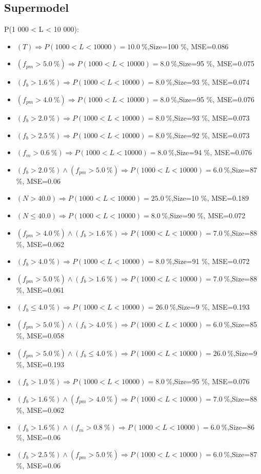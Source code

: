 \documentclass[numbered]{CSL}
\begin{document}
\subsection{Supermodel}
P(1 000 < L < 10 000):
\begin{itemize}
\item $(T) \Rightarrow P(1 000 < L < 10 000) = 10.0~\%$,\hfill Size=100 \%, MSE=0.086
\item $(f_{pm} > 5.0~\%) \Rightarrow P(1 000 < L < 10 000) = 8.0~\%$,\hfill Size=95 \%, MSE=0.075
\item $(f_b > 1.6~\%) \Rightarrow P(1 000 < L < 10 000) = 8.0~\%$,\hfill Size=93 \%, MSE=0.074
\item $(f_{pm} > 4.0~\%) \Rightarrow P(1 000 < L < 10 000) = 8.0~\%$,\hfill Size=95 \%, MSE=0.076
\item $(f_b > 2.0~\%) \Rightarrow P(1 000 < L < 10 000) = 8.0~\%$,\hfill Size=93 \%, MSE=0.073
\item $(f_b > 2.5~\%) \Rightarrow P(1 000 < L < 10 000) = 8.0~\%$,\hfill Size=92 \%, MSE=0.073
\item $(f_m > 0.6~\%) \Rightarrow P(1 000 < L < 10 000) = 8.0~\%$,\hfill Size=94 \%, MSE=0.076
\item $(f_b > 2.0~\%) \land (f_{pm} > 5.0~\%) \Rightarrow P(1 000 < L < 10 000) = 6.0~\%$,\hfill Size=87 \%, MSE=0.06
\item $(N > 40.0) \Rightarrow P(1 000 < L < 10 000) = 25.0~\%$,\hfill Size=10 \%, MSE=0.189
\item $(N \leq 40.0) \Rightarrow P(1 000 < L < 10 000) = 8.0~\%$,\hfill Size=90 \%, MSE=0.072
\item $(f_{pm} > 4.0~\%) \land (f_b > 1.6~\%) \Rightarrow P(1 000 < L < 10 000) = 7.0~\%$,\hfill Size=88 \%, MSE=0.062
\item $(f_b > 4.0~\%) \Rightarrow P(1 000 < L < 10 000) = 8.0~\%$,\hfill Size=91 \%, MSE=0.072
\item $(f_{pm} > 5.0~\%) \land (f_b > 1.6~\%) \Rightarrow P(1 000 < L < 10 000) = 7.0~\%$,\hfill Size=88 \%, MSE=0.061
\item $(f_b \leq 4.0~\%) \Rightarrow P(1 000 < L < 10 000) = 26.0~\%$,\hfill Size=9 \%, MSE=0.193
\item $(f_{pm} > 5.0~\%) \land (f_b > 4.0~\%) \Rightarrow P(1 000 < L < 10 000) = 6.0~\%$,\hfill Size=85 \%, MSE=0.058
\item $(f_{pm} > 5.0~\%) \land (f_b \leq 4.0~\%) \Rightarrow P(1 000 < L < 10 000) = 26.0~\%$,\hfill Size=9 \%, MSE=0.193
\item $(f_b > 1.0~\%) \Rightarrow P(1 000 < L < 10 000) = 8.0~\%$,\hfill Size=95 \%, MSE=0.076
\item $(f_b > 1.6~\%) \land (f_{pm} > 4.0~\%) \Rightarrow P(1 000 < L < 10 000) = 7.0~\%$,\hfill Size=88 \%, MSE=0.062
\item $(f_b > 1.6~\%) \land (f_m > 0.8~\%) \Rightarrow P(1 000 < L < 10 000) = 6.0~\%$,\hfill Size=86 \%, MSE=0.06
\item $(f_b > 2.5~\%) \land (f_{pm} > 5.0~\%) \Rightarrow P(1 000 < L < 10 000) = 6.0~\%$,\hfill Size=87 \%, MSE=0.06
\end{itemize}
\end{document}
